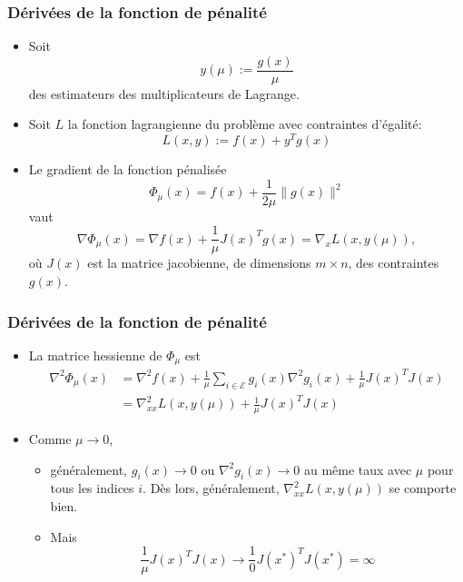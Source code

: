 \documentclass[t,usepdftitle=false]{beamer}
\def\cE{\mathcal{E}}
\begin{document}
\begin{frame}
\frametitle{Dérivées de la fonction de pénalité}

\begin{itemize}
\item
Soit
$$
y(\mu) := \frac{g(x)}{\mu}
$$
des estimateurs des multiplicateurs de Lagrange.
\item
Soit $L$ la fonction lagrangienne du problème avec contraintes d'égalité:
$$
L(x,y) := f(x) + y^Tg(x)
$$
\item
Le gradient de la fonction pénalisée
$$
\Phi_{\mu}(x) = f(x) + \frac{1}{2\mu} \| g(x) \|^2
$$
vaut
$$
\nabla \Phi_{\mu}(x) = \nabla f(x) + \frac{1}{\mu} J(x)^T g(x) = \nabla_x L(x, y(\mu)),
$$
où $J(x)$ est la matrice jacobienne, de dimensions $m \times n$, des contraintes $g(x)$.
\end{itemize}

\end{frame}

\begin{frame}
\frametitle{Dérivées de la fonction de pénalité}

\begin{itemize}
\item
La matrice hessienne de $\Phi_{\mu}$ est
\begin{align*}
\nabla^2 \Phi_{\mu}(x)
&= \nabla^2 f(x) + \frac{1}{\mu} \sum_{i \in \cE} g_i(x) \nabla^2 g_i(x) + \frac{1}{\mu} J(x)^TJ(x) \\
&= \nabla^2_{xx} L(x, y(\mu)) + \frac{1}{\mu} J(x)^TJ(x)
\end{align*}
\item
Comme $\mu \rightarrow 0$,
\begin{itemize}
\item
généralement, $g_i(x) \rightarrow 0$ ou $\nabla^2 g_i(x) \rightarrow 0$ au même taux avec $\mu$ pour tous les indices $i$.
Dès lors, généralement, $\nabla^2_{xx} L(x, y(\mu))$ se comporte bien.
\item
Mais
$$
\frac{1}{\mu} J(x)^TJ(x) \rightarrow \frac{1}{0} J(x^*)^TJ(x^*) = \infty
$$
\end{itemize}
\end{itemize}

\end{frame}
\end{document}
